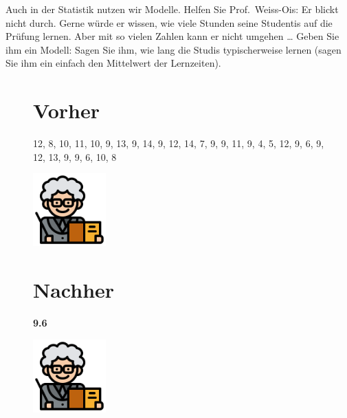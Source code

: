 \documentclass[
  a4paper,
  DIV=11]{scrreprt}
\theoremstyle{definition}
\theoremstyle{definition}
\theoremstyle{definition}
\theoremstyle{remark}
\begin{document}
Auch in der Statistik nutzen wir Modelle. Helfen Sie Prof.~Weiss-Ois: Er
blickt nicht durch. Gerne würde er wissen, wie viele Stunden seine
Studentis auf die Prüfung lernen. Aber mit so vielen Zahlen kann er
nicht umgehen \ldots{} Geben Sie ihm ein Modell: Sagen Sie ihm, wie lang
die Studis typischerweise lernen (sagen Sie ihm ein einfach den
Mittelwert der Lernzeiten).

\begin{figure}

\begin{minipage}{0.50\linewidth}

\section{Vorher}\label{vorher-1}

12, 8, 10, 11, 10, 9, 13, 9, 14, 9, 12, 14, 7, 9, 9, 11, 9, 4, 5, 12, 9,
6, 9, 12, 13, 9, 9, 6, 10, 8

\includegraphics[width=0.25\textwidth,height=\textheight]{img/teacher.png}

\end{minipage}%
%
\begin{minipage}{0.50\linewidth}

\section{Nachher}\label{nachher-1}

\textbf{9.6}

\includegraphics[width=0.25\textwidth,height=\textheight]{img/teacher.png}

\end{minipage}%

\end{figure}%
\end{document}
